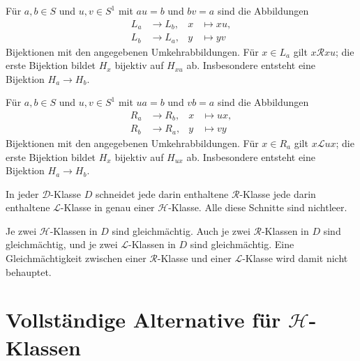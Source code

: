 \begin{theorem}
\label{b28guide:thm:green-lemma-right}
Für $a,b\in S$ und $u,v\in S^1$ mit $au=b$ und $bv=a$
sind die Abbildungen
\[
\begin{aligned}
L_a&\longrightarrow L_b,&x&\longmapsto xu,\\
L_b&\longrightarrow L_a,&y&\longmapsto yv
\end{aligned}
\]
Bijektionen mit den angegebenen Umkehrabbildungen. Für $x\in L_a$ gilt
$x\mathrel{\mathcal R}xu$; die erste Bijektion bildet $H_x$
bijektiv auf $H_{xu}$ ab. Insbesondere entsteht eine Bijektion
$H_a\longrightarrow H_b$.
\cite{harju,howie}
\end{theorem}

\begin{theorem}
\label{b28guide:thm:green-lemma-left}
Für $a,b\in S$ und $u,v\in S^1$ mit $ua=b$ und $vb=a$
sind die Abbildungen
\[
\begin{aligned}
R_a&\longrightarrow R_b,&x&\longmapsto ux,\\
R_b&\longrightarrow R_a,&y&\longmapsto vy
\end{aligned}
\]
Bijektionen mit den angegebenen Umkehrabbildungen. Für $x\in R_a$ gilt
$x\mathrel{\mathcal L}ux$; die erste Bijektion bildet $H_x$
bijektiv auf $H_{ux}$ ab. Insbesondere entsteht eine Bijektion
$H_a\longrightarrow H_b$.
\cite{harju,howie}
\end{theorem}

\begin{theorem}
\label{b28guide:thm:green-grid}
In jeder $\mathcal D$-Klasse $D$ schneidet jede darin enthaltene
$\mathcal R$-Klasse jede darin enthaltene $\mathcal L$-Klasse
in genau einer $\mathcal H$-Klasse. Alle diese Schnitte sind nichtleer.

Je zwei $\mathcal H$-Klassen in $D$ sind gleichmächtig.
Auch je zwei $\mathcal R$-Klassen in $D$ sind gleichmächtig,
und je zwei $\mathcal L$-Klassen in $D$ sind gleichmächtig.
Eine Gleichmächtigkeit zwischen einer $\mathcal R$-Klasse und einer
$\mathcal L$-Klasse wird damit nicht behauptet.
\cite{howie,green1951}
\end{theorem}

\section{Vollständige Alternative für $\mathcal H$-Klassen}


